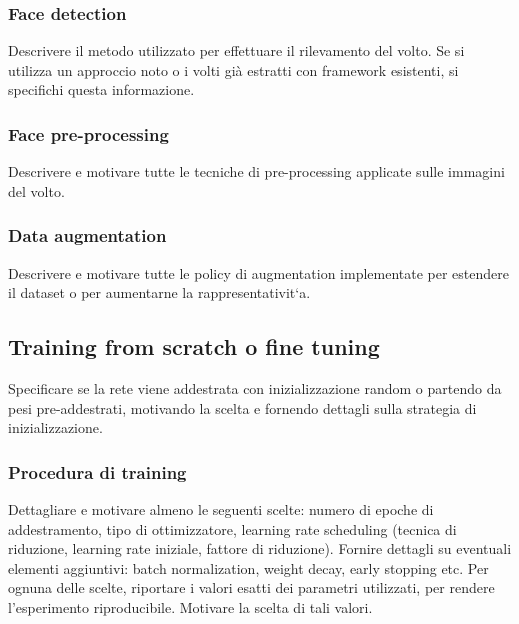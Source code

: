 \subsubsection{Face detection} 
Descrivere il metodo utilizzato per effettuare il rilevamento del volto. Se si utilizza un approccio noto o i volti già estratti con framework esistenti, si specifichi questa informazione.

\subsubsection{Face pre-processing} 
Descrivere e motivare tutte le tecniche di pre-processing applicate sulle immagini del volto.

\subsubsection{Data augmentation}
Descrivere e motivare tutte le policy di augmentation
implementate per estendere il dataset o per aumentarne la rappresentativit`a.

\subsection{Training from scratch o fine tuning}
Specificare se la rete viene addestrata
con inizializzazione random o partendo da pesi pre-addestrati, motivando la
scelta e fornendo dettagli sulla strategia di inizializzazione.

\subsubsection{Procedura di training}
Dettagliare e motivare almeno le seguenti scelte: numero di epoche di addestramento, tipo di ottimizzatore, learning rate scheduling (tecnica di riduzione, learning rate iniziale, fattore di riduzione). Fornire dettagli su eventuali elementi aggiuntivi: batch normalization, weight decay, early stopping etc. Per ognuna delle scelte, riportare i valori esatti dei parametri utilizzati, per rendere l’esperimento riproducibile. Motivare la scelta di tali valori.
